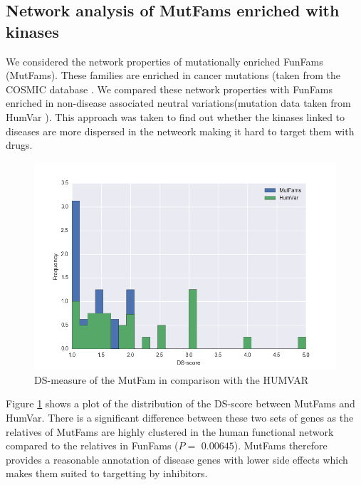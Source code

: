 \documentclass[a4paper, 11pt]{article}
\begin{document}
\subsection*{Network analysis of MutFams enriched with kinases}
We considered the network properties of mutationally enriched FunFams (MutFams). These families are enriched in cancer mutations (taken from the COSMIC database \cite{bamford2004cosmic}. We compared these network properties with FunFams enriched in non-disease associated neutral variations(mutation data taken from HumVar \cite{capriotti2006predicting}). This approach was taken to find out whether the kinases linked to diseases are more dispersed in the netweork making it hard to target them with drugs.
\begin{figure}[H]
	\includegraphics[width=\linewidth]{figures/mutvar.png}
	\centering
	\caption{DS-measure of the MutFam in comparison with the HUMVAR}
	\label{mutvar}
\end{figure}
Figure \ref{mutvar} shows a plot of the distribution of the DS-score between MutFams and HumVar. There is a significant difference between these two sets of genes as the relatives of MutFams are highly clustered in the human functional network compared to the relatives in FunFams ($P=$ $0.00645$). MutFams therefore provides a reasonable annotation of disease genes with lower side effects which makes them suited to targetting by inhibitors.
\end{document}
